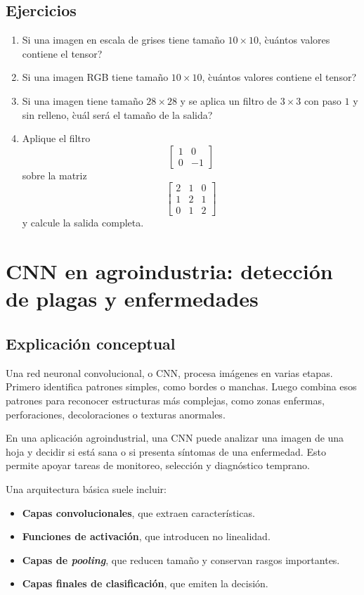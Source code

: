 \documentclass[12pt]{article}
\begin{document}
\subsection{Ejercicios}
\begin{enumerate}[label=\arabic*.]
    \item Si una imagen en escala de grises tiene tamaño \(10\times 10\), \`cuántos valores contiene el tensor?
    \item Si una imagen RGB tiene tamaño \(10\times 10\), \`cuántos valores contiene el tensor?
    \item Si una imagen tiene tamaño \(28\times 28\) y se aplica un filtro de \(3\times 3\) con paso \(1\) y sin relleno, \`cuál será el tamaño de la salida?
    \item Aplique el filtro
    \[
    \begin{bmatrix}
    1 & 0 \\
    0 & -1
    \end{bmatrix}
    \]
    sobre la matriz
    \[
    \begin{bmatrix}
    2 & 1 & 0 \\
    1 & 2 & 1 \\
    0 & 1 & 2
    \end{bmatrix}
    \]
    y calcule la salida completa.
\end{enumerate}


\section{CNN en agroindustria: detección de plagas y enfermedades}

\subsection{Explicación conceptual}
Una red neuronal convolucional, o CNN, procesa imágenes en varias etapas.
Primero identifica patrones simples, como bordes o manchas.
Luego combina esos patrones para reconocer estructuras más complejas, como zonas enfermas, perforaciones, decoloraciones o texturas anormales.

En una aplicación agroindustrial, una CNN puede analizar una imagen de una hoja y decidir si está sana o si presenta síntomas de una enfermedad.
Esto permite apoyar tareas de monitoreo, selección y diagnóstico temprano.

Una arquitectura básica suele incluir:
\begin{itemize}
    \item \textbf{Capas convolucionales}, que extraen características.
    \item \textbf{Funciones de activación}, que introducen no linealidad.
    \item \textbf{Capas de \textit{pooling}}, que reducen tamaño y conservan rasgos importantes.
    \item \textbf{Capas finales de clasificación}, que emiten la decisión.
\end{itemize}
\end{document}
